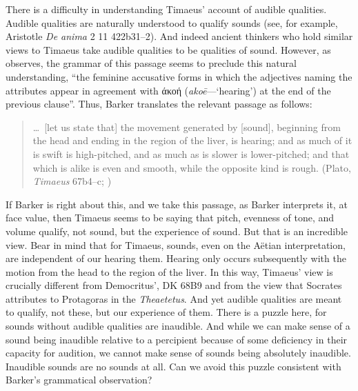 There is a difficulty in understanding Timaeus' account of audible qualities. Audible qualities are naturally understood to qualify sounds (see, for example, Aristotle \emph{De anima} 2 11 422b31–2). And indeed ancient thinkers who hold similar views to Timaeus take audible qualities to be qualities of sound. However, as \citet[87--88]{Barker:2000dy} observes, the grammar of this passage seems to preclude this natural understanding, ``the feminine accusative forms in which the adjectives naming the attributes appear in agreement with {\sbl άκοή} (\emph{akoē}---`hearing') at the end of the previous clause''. Thus, Barker translates the relevant passage as follows:
\begin{quote}
	\ldots\ [let us state that] the movement generated by [sound], beginning from the head and ending in the region of the liver, is hearing; and as much of it is swift is high-pitched, and as much as is slower is lower-pitched; and that which is alike is even and smooth, while the opposite kind is rough. (Plato, \emph{Timaeus} 67b4--c; \citealt[98 n4]{Barker:2000dy}) 
\end{quote}
If Barker is right about this, and we take this passage, as Barker interprets it, at face value, then Timaeus seems to be saying that pitch, evenness of tone, and volume qualify, not sound, but the experience of sound. But that is an incredible view. Bear in mind that for Timaeus, sounds, even on the Aëtian interpretation, are independent of our hearing them. Hearing only occurs subsequently with the motion from the head to the region of the liver. In this way, Timaeus' view is crucially different from Democritus', DK 68B9 and from the view that Socrates attributes to Protagoras in the \emph{Theaetetus}. And yet audible qualities are meant to qualify, not these, but our experience of them. There is a puzzle here, for sounds without audible qualities are inaudible. And while we can make sense of a sound being inaudible relative to a percipient because of some deficiency in their capacity for audition, we cannot make sense of sounds being absolutely inaudible. Inaudible sounds are no sounds at all. Can we avoid this puzzle consistent with Barker's grammatical observation?

